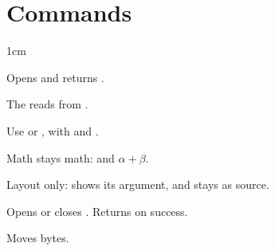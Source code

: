 \section{Commands}

\begin{ENTRIES}{1cm}

 {Opens  and returns \Ret{\Yes}.}
%

The \Product{} \Edition{} reads  from .

Use  or , with  and .

Math stays math:  and $\alpha + \beta$.

Layout only:  shows its argument, and \Spin{} stays as source.

{
  Opens or closes . Returns
  \Ret{\Yes} on success.
}

 {Moves bytes.}

\end{ENTRIES}
